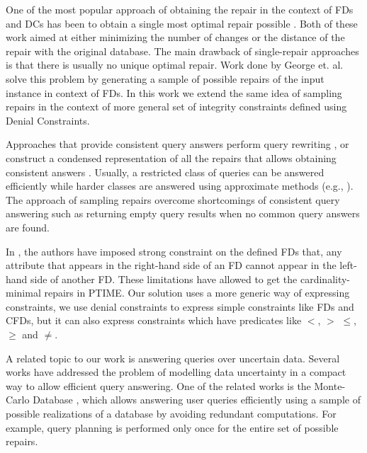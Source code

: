One of the most popular approach of obtaining the repair in the context of FDs and DCs has been to obtain a single most optimal repair possible \cite{Kolahi,XuChu}.
Both of these work aimed at either minimizing the number of changes or the distance of the repair with the original database.
The main drawback of single-repair approaches is that there is usually no unique optimal repair.
Work done by George et. al. \cite{Beskales_sampling} solve this problem by generating a sample of possible repairs of the input instance in context of FDs.
In this work we extend the same idea of sampling repairs in the context of more general set of integrity constraints defined using Denial Constraints.

Approaches that provide consistent query answers perform query rewriting \cite{Arenas,Fuxman}, 
or construct a condensed representation of all the repairs that allows obtaining consistent answers \cite{Wijsen}.
Usually, a restricted class of queries can be answered efficiently while harder classes are answered using approximate methods (e.g., \cite{Lopatenko}).
The approach of sampling repairs overcome shortcomings of consistent query answering such as returning empty query results when no common query answers are found.

In \cite{Greco}, the authors have imposed strong constraint on the defined FDs that, any attribute that appears in the right-hand side of an FD cannot appear in the left-hand side of another FD.
These limitations have allowed to get the cardinality-minimal repairs in PTIME.
Our solution uses a more generic way of expressing constraints, we use denial constraints to express simple constraints like FDs and CFDs, 
but it can also express constraints which have predicates like $<$, $>$ $\leq$, $\geq$ and $\neq$.

A related topic to our work is answering queries over uncertain data.
Several works have addressed the problem of modelling data uncertainty in a compact way to allow efficient query answering.
One of the related works is the Monte-Carlo Database \cite{Jampani}, which allows answering user queries efficiently using a sample of possible realizations of a database by avoiding redundant computations.
For example, query planning is performed only once for the entire set of possible repairs.
